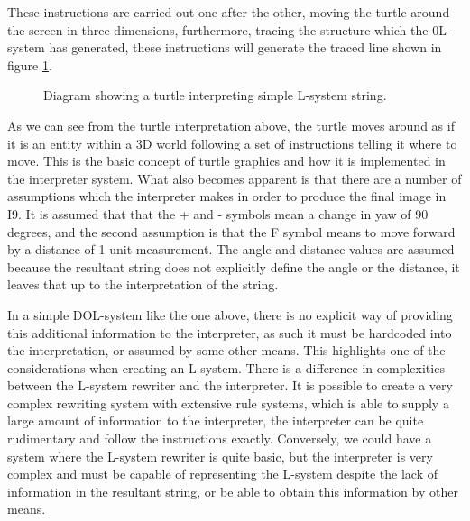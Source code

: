 \begin{flushleft}
These instructions are carried out one after the other, moving the turtle around the screen in three dimensions, furthermore, tracing the structure which the 0L-system has generated, these instructions will generate the traced line shown in figure \ref{basic turtle}.

\vspace{5mm}

\begin{figure}[htbp]
	{\centering
		\setlength{\fboxrule}{1pt}
		\vspace{7px}
		\caption{Diagram showing a turtle interpreting simple L-system string.} \label{basic turtle}
	}
\end{figure}
\FloatBarrier

\vspace{5mm}

As we can see from the turtle interpretation above, the turtle moves around as if it is an entity within a 3D world following a set of instructions telling it where to move. This is the basic concept of turtle graphics and how it is implemented in the interpreter system. What also becomes apparent is that there are a number of assumptions which the interpreter makes in order to produce the final image in I9. It is assumed that that the + and - symbols mean a change in yaw of 90 degrees, and the second assumption is that the F symbol means to move forward by a distance of 1 unit measurement. The angle and distance values are assumed because the resultant string does not explicitly define the angle or the distance, it leaves that up to the interpretation of the string. \\

\vspace{5mm}

In a simple DOL-system like the one above, there is no explicit way of providing this additional information to the interpreter, as such it must be hardcoded into the interpretation, or assumed by some other means. This highlights one of the considerations when creating an L-system. There is a difference in complexities between the L-system rewriter and the interpreter. It is possible to create a very complex rewriting system with extensive rule systems, which is able to supply a large amount of information to the interpreter, the interpreter can be quite rudimentary and follow the instructions exactly. Conversely, we could have a system where the L-system rewriter is quite basic, but the interpreter is very complex and must be capable of representing the L-system despite the lack of information in the resultant string, or be able to obtain this information by other means. \\


\end{flushleft}

